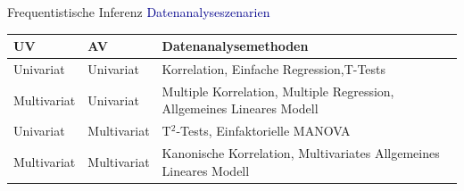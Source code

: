 \documentclass[
  8pt,
  ignorenonframetext,
]{beamer}
\begin{document}
\begin{frame}{Frequentistische Inferenz}
\protect\hypertarget{frequentistische-inferenz}{}
\textcolor{darkblue}{Datenanalyseszenarien} \vspace{2mm}

\small
\renewcommand{\arraystretch}{2}
\begin{tabular}{lll}
UV
& AV
& Datenanalysemethoden
\\\hline
Univariat
& Univariat
& Korrelation, Einfache Regression,T-Tests
\\
Multivariat
& Univariat
& Multiple Korrelation, Multiple Regression, Allgemeines Lineares Modell
\\
Univariat
& Multivariat
& T$^2$-Tests, Einfaktorielle MANOVA
\\
Multivariat
& Multivariat
& Kanonische Korrelation, Multivariates Allgemeines Lineares Modell
\end{tabular}
\end{frame}
\end{document}

